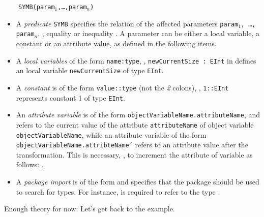 ~~~~\texttt{SYMB(param$_1$,\ldots,param$_n$)}

\begin{itemize}
\item A \emph{predicate} \texttt{SYMB} specifies the relation of the affected parameters \texttt{param$_1$, \ldots, param$_n$}, \eg, equality \entity{=} or inequality \entity{!=}.
A parameter can be either a local variable, a constant or an attribute value, as defined in the following items.
    
\item A \emph{local variables} of the form \texttt{name:type}, \eg, \texttt{newCurrentSize : EInt} in  defines an local variable \texttt{newCurrentSize} of type \texttt{EInt}. 

\item A \emph{constant} is of the form \texttt{value::type} (not the \emph{2} colons), \eg, \texttt{1::EInt} represents constant 1 of type \texttt{EInt}.

\item An \emph{attribute variable} is of the form \texttt{object\-Variable\-Name.attribute\-Name}, and refers to the current value of the attribute \texttt{attributeName} of object variable 	\texttt{object\-Variable\-Name}, while an attribute variable of the form \texttt{object\-Variable\-Name\-.attribte\-Name'} refers to an attribute value after the transformation.
This is necessary, \eg, to increment the attribute  of variable  as follows: . 

\item A \emph{package import} is of the form  and specifies that the package  should be used to search for types.
For instance,  is required to refer to the type . 
\end{itemize}
%
Enough theory for now:
Let's get back to the example.
